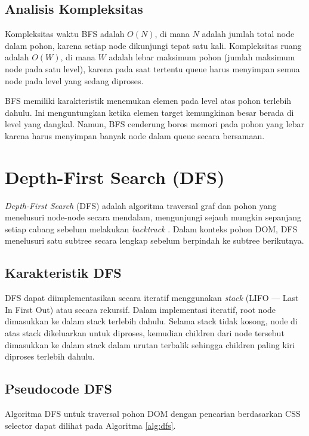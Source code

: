 \subsection{Analisis Kompleksitas}

Kompleksitas waktu BFS adalah $O(N)$, di mana $N$ adalah jumlah total node dalam
pohon, karena setiap node dikunjungi tepat satu kali. Kompleksitas ruang adalah
$O(W)$, di mana $W$ adalah lebar maksimum pohon (jumlah maksimum node pada satu
level), karena pada saat tertentu queue harus menyimpan semua node pada level
yang sedang diproses.

BFS memiliki karakteristik menemukan elemen pada level atas pohon terlebih dahulu.
Ini menguntungkan ketika elemen target kemungkinan besar berada di level yang
dangkal. Namun, BFS cenderung boros memori pada pohon yang lebar karena harus
menyimpan banyak node dalam queue secara bersamaan.

\section{Depth-First Search (DFS)}

\textit{Depth-First Search} (DFS) adalah algoritma traversal graf dan pohon yang
menelusuri node-node secara mendalam, mengunjungi sejauh mungkin sepanjang setiap
cabang sebelum melakukan \textit{backtrack} \cite{cormen2009introduction}. Dalam
konteks pohon DOM, DFS menelusuri satu subtree secara lengkap sebelum berpindah
ke subtree berikutnya.

\subsection{Karakteristik DFS}

DFS dapat diimplementasikan secara iteratif menggunakan \textit{stack} (LIFO ---
Last In First Out) atau secara rekursif. Dalam implementasi iteratif, root node
dimasukkan ke dalam stack terlebih dahulu. Selama stack tidak kosong, node di
atas stack dikeluarkan untuk diproses, kemudian children dari node tersebut
dimasukkan ke dalam stack dalam urutan terbalik sehingga children paling kiri
 diproses terlebih dahulu.

\subsection{Pseudocode DFS}

Algoritma DFS untuk traversal pohon DOM dengan pencarian berdasarkan CSS selector
dapat dilihat pada Algoritma \ref{alg:dfs}.

